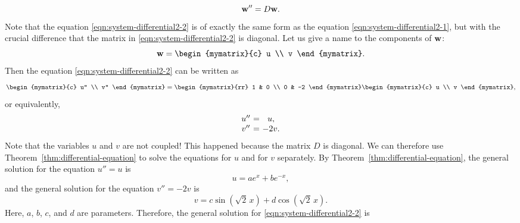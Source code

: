 \begin{solution}
\begin{equation}
    \mbox{\bf w}'' = D\mbox{\bf w}.
  \end{equation}
  Note that the equation {\eqref{eqn:system-differential2-2}} is of
  exactly the same form as the equation
  {\eqref{eqn:system-differential2-1}}, but with the crucial
  difference that the matrix in {\eqref{eqn:system-differential2-2}}
  is diagonal. Let us give a name to the components of $\mbox{\bf w}$:
  \begin{equation*}
    \vect{w} = \begin{mymatrix}{c} u \\ v \end{mymatrix}.
  \end{equation*}
  Then the equation {\eqref{eqn:system-differential2-2}} can be
  written as
  \begin{equation*}
    \begin{mymatrix}{c} u'' \\ v'' \end{mymatrix}
    =
    \begin{mymatrix}{rr} 1 & 0 \\ 0 & -2 \end{mymatrix}
    \begin{mymatrix}{c} u \\ v \end{mymatrix},
  \end{equation*}
  or equivalently,
  \begin{equation*}
    \begin{array}{c@{~}c@{~}c}
      u'' &=& u, \\
      v'' &=& -2v. \\
    \end{array}
  \end{equation*}
  Note that the variables $u$ and $v$ are not coupled! This happened
  because the matrix $D$ is diagonal. We can therefore use
  Theorem~\ref{thm:differential-equation} to solve the equations for
  $u$ and for $v$ separately. By
  Theorem~\ref{thm:differential-equation}, the general solution for
  the equation $u'' = u$ is
  \begin{equation*}
    u = a e^{x} + b e^{-x},
  \end{equation*}
  and the general solution for the equation $v''=-2v$ is
  \begin{equation*}
    v = c\sin(\sqrt{2}\,x) + d\cos(\sqrt{2}\,x).
  \end{equation*}
  Here, $a$, $b$, $c$, and $d$ are parameters. Therefore, the general
  solution for {\eqref{eqn:system-differential2-2}} is

\end{solution}
